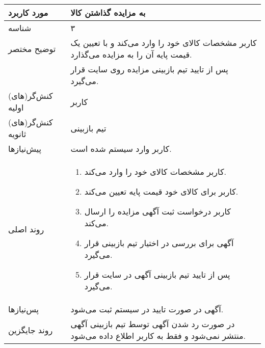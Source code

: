 \documentclass{article}
\begin{document}
\begin{center}
\begin{tabular} {|p{}|p{}|}
\hline
 مورد کاربرد & 
 به مزایده گذاشتن کالا
\\ \hline
 شناسه &
۳
\\ \hline
توضیح مختصر &
کاربر مشخصات کالای خود را وارد می‌کند و با تعیین یک قیمت پایه آن را به مزایده می‌گذارد.
\\
&
پس از تایید تیم بازبینی مزایده روی سایت قرار می‌گیرد.
\\ \hline
کنش‌گر(های) اولیه &
کاربر
\\ \hline
کنش‌گر(های) ثانویه &
تیم بازبینی
\\ \hline
پیش‌نیازها &
کاربر وارد سیستم شده است.
\\ \hline
روند اصلی &
\begin{enumerate}
\item
کاربر مشخصات کالای خود را وارد می‌کند.
\item
کاربر برای کالای خود قیمت پایه تعیین می‌کند.
\item
کاربر درخواست ثبت آگهی مزایده را ارسال می‌کند.
\item
آگهی برای بررسی در اختیار تیم بازبینی قرار می‌گیرد.
\item
پس از تایید تیم بازبینی آگهی در سایت قرار می‌گیرد.
\end{enumerate}
\\ \hline
پس‌نیازها &
آگهی در صورت تایید در سیستم ثبت می‌شود.
\\ \hline
روند جایگزین &
در صورت رد شدن آگهی توسط تیم بازبینی آگهی منتشر نمی‌شود و فقط به کاربر اطلاع داده می‌شود. 
\\ \hline
\end{tabular}
\end{center}

\newpage
\end{document}

